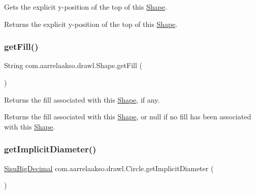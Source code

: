 Gets the explicit y-\/position of the top of this \hyperlink{classcom_1_1aarrelaakso_1_1drawl_1_1_shape}{Shape}.

\begin{DoxyReturn}{Returns}
the explicit y-\/position of the top of this \hyperlink{classcom_1_1aarrelaakso_1_1drawl_1_1_shape}{Shape}. 
\end{DoxyReturn}
\mbox{\label{classcom_1_1aarrelaakso_1_1drawl_1_1_shape_a0d9a33a3e151aaceeec140bea343a650}} 
\subsubsection{\texorpdfstring{get\+Fill()}{getFill()}}
{\footnotesize\ttfamily String com.\+aarrelaakso.\+drawl.\+Shape.\+get\+Fill (\begin{DoxyParamCaption}{ }\end{DoxyParamCaption})\hspace{0.3cm}{\ttfamily [inherited]}}

Returns the fill associated with this \hyperlink{classcom_1_1aarrelaakso_1_1drawl_1_1_shape}{Shape}, if any.

\begin{DoxyReturn}{Returns}
the fill associated with this \hyperlink{classcom_1_1aarrelaakso_1_1drawl_1_1_shape}{Shape}, or null if no fill has been associated with this \hyperlink{classcom_1_1aarrelaakso_1_1drawl_1_1_shape}{Shape}. 
\end{DoxyReturn}
\mbox{\label{classcom_1_1aarrelaakso_1_1drawl_1_1_circle_afdf1eafa90768ab10a9a6ceb25941e34}} 
\subsubsection{\texorpdfstring{get\+Implicit\+Diameter()}{getImplicitDiameter()}}
{\footnotesize\ttfamily \hyperlink{classcom_1_1aarrelaakso_1_1drawl_1_1_sisu_big_decimal}{Sisu\+Big\+Decimal} com.\+aarrelaakso.\+drawl.\+Circle.\+get\+Implicit\+Diameter (\begin{DoxyParamCaption}{ }\end{DoxyParamCaption})\hspace{0.3cm}{\ttfamily [protected]}}

